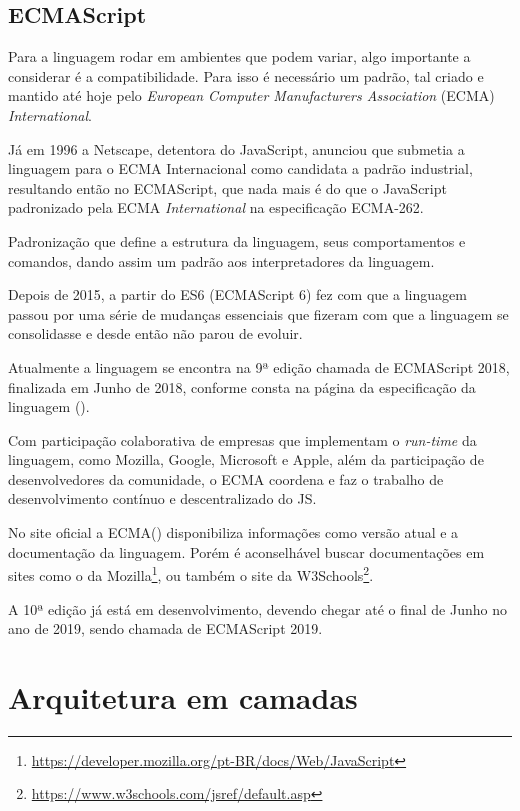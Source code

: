 \documentclass[
	12pt,				%
	openright,			%
	twoside,			%
	a4paper,			%
	english,			%
	brazil				%
	]{abntex2}
\begin{document}
\subsection{ECMAScript}

Para a linguagem rodar em ambientes que podem variar, algo importante a considerar é a compatibilidade. Para isso é necessário um padrão, tal criado e mantido até hoje pelo \textit{European Computer Manufacturers Association} (ECMA) \textit{International}. 

Já em 1996 a Netscape, detentora do JavaScript, anunciou que submetia a linguagem para o ECMA Internacional como candidata a padrão industrial, resultando então no ECMAScript, que nada mais é do que o JavaScript padronizado pela ECMA \textit{International} na especificação ECMA-262. 

Padronização que define a estrutura da linguagem, seus comportamentos e comandos, dando assim um padrão aos interpretadores da linguagem. 

Depois de 2015, a partir do ES6 (ECMAScript 6) fez com que a linguagem passou por uma série de mudanças essenciais que fizeram com que a linguagem se consolidasse e desde então não parou de evoluir.

Atualmente a linguagem se encontra na 9ª edição chamada de ECMAScript 2018, finalizada em Junho de 2018, conforme consta na página da especificação da linguagem (\citeauthor{ecma_standard}).

Com participação colaborativa de empresas que implementam o \textit{run-time} da linguagem, como Mozilla, Google, Microsoft e Apple, além da participação de desenvolvedores da comunidade, o ECMA coordena e faz o trabalho de desenvolvimento contínuo e descentralizado do JS.

No site oficial a ECMA(\citeauthor{ecma_standard}) disponibiliza informações como versão atual e a documentação da linguagem. Porém é aconselhável buscar documentações em sites como o da Mozilla\footnote{\url{https://developer.mozilla.org/pt-BR/docs/Web/JavaScript}}, ou também o site da W3Schools\footnote{\url{https://www.w3schools.com/jsref/default.asp}}. 

A 10ª edição já está em desenvolvimento, devendo chegar até o final de Junho no ano de 2019, sendo chamada de ECMAScript 2019.

\section{Arquitetura em camadas}
\label{sec:Arquitetura}
\end{document}
